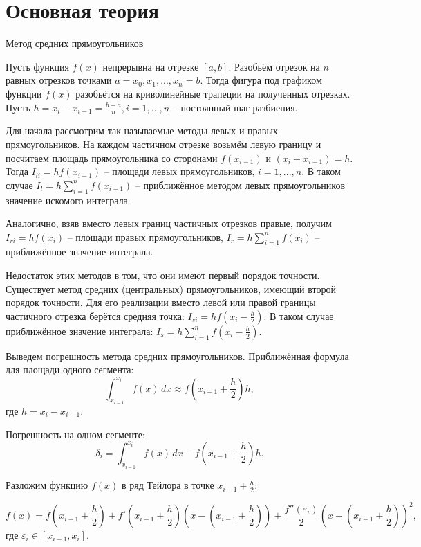 \documentclass[a4paper, 14pt]{extarticle}
\begin{document}
\section{Основная теория}
\begin{justify}

\noindent\large {Метод средних прямоугольников}\\ \normalsize

Пусть функция $f(x)$ непрерывна на отрезке $[a, b]$. Разобьём отрезок на $n$ равных отрезков точками
$a = x_0, x_1, ..., x_n = b$. Тогда фигура под графиком функции $f(x)$ разобьётся на криволинейные 
трапеции на полученных отрезках. Пусть $h = x_{i} - x_{i-1} = \frac{b - a}{n}, i = 1, ..., n$ -- постоянный шаг разбиения. 

Для начала рассмотрим так называемые методы левых и правых прямоугольников. На каждом частичном отрезке возьмём левую границу и посчитаем площадь прямоугольника со сторонами 
$f(x_{i-1})$ и $(x_{i} - x_{i-1}) = h$. Тогда $I_{li} = hf(x_{i-1})$ -- площади левых прямоугольников, 
$i = 1, ..., n$. В таком случае $I_{l} = h \sum_{i=1}^{n} f(x_{i-1})$ -- приближённое методом левых прямоугольников 
значение искомого интеграла. 

Аналогично, взяв вместо левых границ частичных отрезков правые, получим 
$I_{ri} = hf(x_{i})$ -- площади правых прямоугольников, $I_{r} = h \sum_{i=1}^{n} f(x_{i})$ -- приближённое значение
интеграла. 

Недостаток этих методов в том, что они имеют первый порядок точности. Существует метод средних (центральных) прямоугольников, 
имеющий второй порядок точности. Для его реализации вместо левой или правой границы частичного отрезка берётся средняя точка: 
$I_{si} = hf(x_{i}-\frac{h}{2})$. В таком случае приближённое значение интеграла: $I_{s} = h \sum_{i=1}^{n} f(x_{i} - \frac{h}{2})$. 

Выведем погрешность метода средних прямоугольников. Приближённая формула для площади одного сегмента:
\[
\int_{x_{i-1}}^{x_i} f(x)\, dx \approx f\left(x_{i-1} + \frac{h}{2} \right) h,
\]
где \( h = x_i - x_{i-1} \).

Погрешность на одном сегменте:
\[
\delta_i = \int_{x_{i-1}}^{x_i} f(x)\, dx - f\left(x_{i-1} + \frac{h}{2} \right) h.
\]

Разложим функцию \( f(x) \) в ряд Тейлора в точке \( x_{i-1} + \frac{h}{2} \):

\[
f(x) = f\left(x_{i-1} + \frac{h}{2}\right) + f'\left(x_{i-1} + \frac{h}{2}\right)\left(x - \left(x_{i-1} + \frac{h}{2}\right)\right) + \frac{f''(\varepsilon_i)}{2}\left(x - \left(x_{i-1} + \frac{h}{2}\right)\right)^2,
\]
где \( \varepsilon_i \in [x_{i-1}, x_i] \).


\end{justify}
\end{document}
